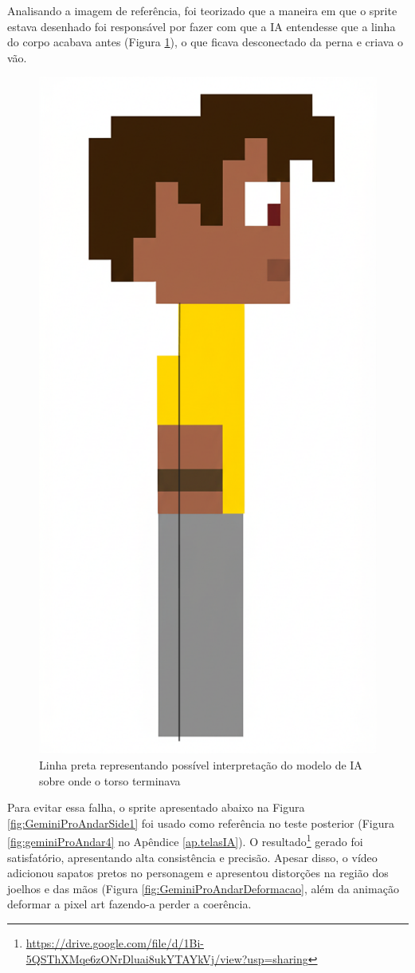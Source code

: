 Analisando a imagem de referência, foi teorizado que a maneira em que o sprite estava desenhado foi responsável por fazer com que a IA entendesse que a linha do corpo acabava antes (Figura \ref{fig:geminiProAndarLinhaCorpo}), o que ficava desconectado da perna e criava o vão. 

\begin{figure}[htbp]
    \centering
    \caption{\small Linha preta representando possível interpretação do modelo de IA sobre onde o torso terminava}
    \label{fig:geminiProAndarLinhaCorpo}
    \includegraphics[width=0.3\linewidth]{figs/geminiPro/chat3/linhaCorpo.png}
\end{figure}

Para evitar essa falha, o sprite apresentado abaixo na Figura \ref{fig:GeminiProAndarSide1} foi usado como referência no teste posterior (Figura \ref{fig:geminiProAndar4} no Apêndice \ref{ap.telasIA}). O resultado\footnote{\url{https://drive.google.com/file/d/1Bi-5QSThXMqe6zONrDluai8ukYTAYkVj/view?usp=sharing}} gerado foi satisfatório, apresentando alta consistência e precisão. Apesar disso, o vídeo adicionou sapatos pretos no personagem e apresentou distorções na região dos joelhos e das mãos (Figura \ref{fig:GeminiProAndarDeformacao}, além da animação deformar a pixel art fazendo-a perder a coerência. 

